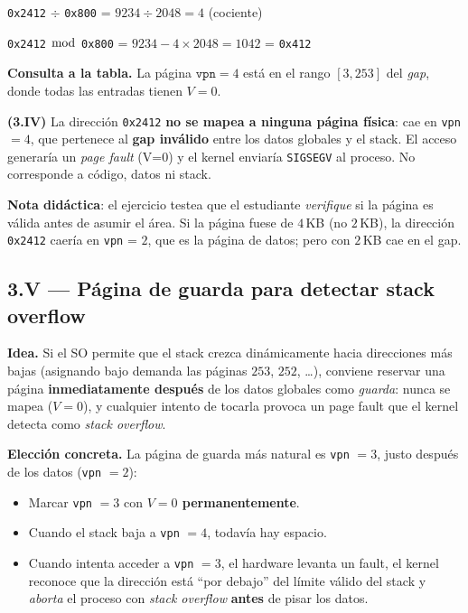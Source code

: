 \documentclass[11pt,a4paper]{article}
\begin{document}
\quad \texttt{0x2412} $\div$ \texttt{0x800} = $9234 \div 2048 = 4$ (cociente)

\quad \texttt{0x2412} $\bmod$ \texttt{0x800} = $9234 - 4 \times 2048 = 1042$ = \texttt{0x412}

\textbf{Consulta a la tabla.} La página $\texttt{vpn} = 4$ está en el
rango $[3, 253]$ del \emph{gap}, donde todas las entradas tienen
$V = 0$.

\begin{respuesta}
\textbf{(3.IV)} La dirección \texttt{0x2412} \textbf{no se mapea a
ninguna página física}: cae en \texttt{vpn} $= 4$, que pertenece al
\textbf{gap inválido} entre los datos globales y el stack. El acceso
generaría un \emph{page fault} (V=0) y el kernel enviaría
\texttt{SIGSEGV} al proceso. No corresponde a código, datos ni stack.

\textbf{Nota didáctica}: el ejercicio testea que el estudiante
\emph{verifique} si la página es válida antes de asumir el área. Si la
página fuese de $4$\,KB (no $2$\,KB), la dirección \texttt{0x2412}
caería en \texttt{vpn} = $2$, que es la página de datos; pero con
$2$\,KB cae en el gap.
\end{respuesta}

\subsection*{3.V --- Página de guarda para detectar stack overflow}

\textbf{Idea.} Si el SO permite que el stack crezca dinámicamente
hacia direcciones más bajas (asignando bajo demanda las páginas $253$,
$252$, \ldots), conviene reservar una página \textbf{inmediatamente
después} de los datos globales como \emph{guarda}: nunca se mapea
($V=0$), y cualquier intento de tocarla provoca un page fault que el
kernel detecta como \emph{stack overflow}.

\textbf{Elección concreta.} La página de guarda más natural es
\texttt{vpn} $= 3$, justo después de los datos (\texttt{vpn} $= 2$):

\begin{itemize}[leftmargin=*,nosep]
    \item Marcar \texttt{vpn} $= 3$ con \textbf{$V = 0$ permanentemente}.
    \item Cuando el stack baja a \texttt{vpn} $= 4$, todavía hay
        espacio.
    \item Cuando intenta acceder a \texttt{vpn} $= 3$, el hardware
        levanta un fault, el kernel reconoce que la dirección está
        ``por debajo'' del límite válido del stack y \emph{aborta} el
        proceso con \emph{stack overflow} \textbf{antes} de pisar los
        datos.
\end{itemize}
\end{document}
